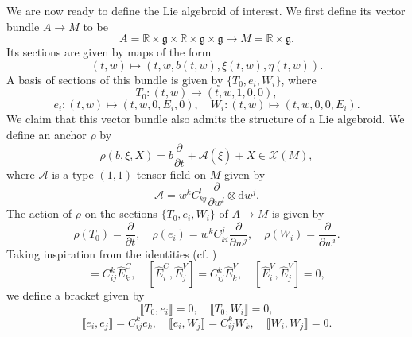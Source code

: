 \documentclass[11pt]{article}
\theoremstyle{plain}
\theoremstyle{definition}
\begin{document}
We are now ready to define the Lie algebroid of interest. We first define its vector bundle $A\to M$ to be
\begin{equation}\label{eqn:liealgebroidinvprob}
    A=\mathbb{R}\times \mathfrak{g}\times \mathbb{R}\times \mathfrak{g}\times \mathfrak{g}\longrightarrow M=\mathbb{R}\times \mathfrak{g}.
\end{equation}
Its sections are given by maps of the form
\begin{equation*}
    (t,w)\longmapsto (t,w,b(t,w),\xi(t,w),\eta(t,w)).
\end{equation*}
A basis of sections of this bundle is given by $\{T_0,e_i,W_i\}$, where
\begin{equation*}
    T_0\colon (t,w)\longmapsto (t,w,1,0,0),
\end{equation*}
\begin{equation*}
    e_i\colon (t,w)\longmapsto (t,w,0,E_i,0),\quad W_i\colon (t,w)\longmapsto (t,w,0,0,E_i).
\end{equation*}
We claim that this vector bundle also admits the structure of a Lie algebroid. We define an anchor $\rho$ by
\begin{equation*}
    \rho(b,\xi,X)=b\frac{\partial}{\partial t}+\mathcal{A}(\bar{\xi})+X\in \mathcal{X}(M),
\end{equation*}
where $\mathcal{A}$ is a type $(1,1)$-tensor field on $M$ given by
\begin{equation*}
    \mathcal{A}=w^k C_{kj}^l \frac{\partial}{\partial w^l}\otimes \mathrm{d}w^j.
\end{equation*}
The action of $\rho$ on the sections $\{T_0,e_i,W_i\}$ of $A\to M$ is given by
\begin{equation}\label{IPalganchor}
    \rho(T_0)=\frac{\partial}{\partial t},\quad \rho(e_i)=w^k C_{ki}^j \frac{\partial}{\partial w^j},\quad \rho(W_i)=\frac{\partial}{\partial w^i}.
\end{equation}
Taking inspiration from the identities (cf. )
\begin{equation*}
    [\widehat{E}_i^C,\widehat{E}_j^C]=C_{ij}^k \widehat{E}_k^C,\quad [\widehat{E}_i^C,\widehat{E}_j^V]=C_{ij}^k \widehat{E}_k^V,\quad [\widehat{E}_i^V,\widehat{E}_j^V]=0,
\end{equation*}
we define a bracket given by
\begin{equation} \label{IPalgbracket1}
    \llbracket T_0,e_i\rrbracket=0,\quad \llbracket T_0,W_i\rrbracket=0,
\end{equation}
\begin{equation} \label{IPalgbracket2}
    \llbracket e_i,e_j\rrbracket=C_{ij}^k e_k,\quad \llbracket e_i,W_j\rrbracket=C_{ij}^k W_k,\quad \llbracket W_i,W_j\rrbracket=0.
\end{equation}
\end{document}
